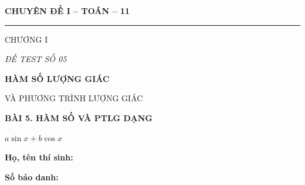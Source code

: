 \documentclass[12pt,a4paper]{article}
\begin{document}
\noindent
\begin{minipage}[t]{.35\textwidth}
  \centering
  {\bfseries CHUYÊN ĐỀ I -- TOÁN -- 11\par}
  \vspace{2pt}\rule{.72\linewidth}{.4pt}\par\vspace{3pt}
  CHƯƠNG I\par\vspace{4pt}
  {\itshape ĐỀ TEST SỐ 05\par}
\end{minipage}\hfill
\begin{minipage}[t]{.62\textwidth}
  \centering
  {\bfseries HÀM SỐ LƯỢNG GIÁC\par
  VÀ PHƯƠNG TRÌNH LƯỢNG GIÁC\par}
  \vspace{5pt}
  {\small\bfseries BÀI 5. HÀM SỐ VÀ PTLG DẠNG\par
  $a\sin x+b\cos x$\par}
\end{minipage}
\vspace{7mm}
\noindent
\begin{minipage}[t]{.72\textwidth}
  \textbf{Họ, tên thí sinh:}\dotfill\par
  \vspace{3pt}
  \textbf{Số báo danh:}\dotfill
\end{minipage}\hfill
\begin{minipage}[t]{.25\textwidth}
  \raggedleft\setlength{\fboxsep}{4pt}
\end{minipage}
\end{document}
